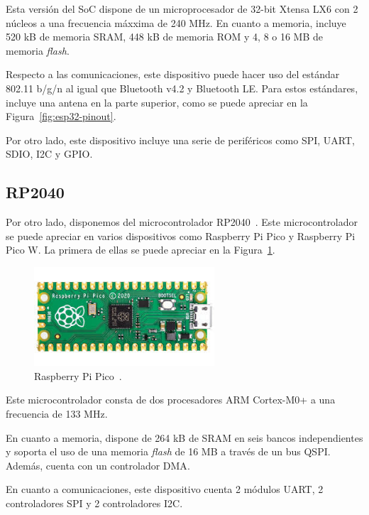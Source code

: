 Esta versión del \ac{SoC} dispone de un microprocesador de 32-bit Xtensa LX6 con 2 núcleos a una frecuencia máxxima de 240 MHz.
En cuanto a memoria, incluye 520 kB de memoria SRAM, 448 kB de memoria ROM y 4, 8 o 16 MB de memoria \textit{flash}.

Respecto a las comunicaciones, este dispositivo puede hacer uso del estándar 802.11 b/g/n al igual que Bluetooth v4.2 y Bluetooth LE.
Para estos estándares, incluye una antena en la parte superior, como se puede apreciar en la Figura~\ref{fig:esp32-pinout}.

Por otro lado, este dispositivo incluye una serie de periféricos como \ac{SPI}, \ac{UART}, \ac{SDIO}, \ac{I2C} y \ac{GPIO}.



\subsection{RP2040}\label{subsec:RP2040}

Por otro lado, disponemos del microcontrolador RP2040~\cite{rp2040-spec}.
Este microcontrolador se puede apreciar en varios dispositivos como Raspberry Pi Pico y Raspberry Pi Pico W.
La primera de ellas se puede apreciar en la Figura~\ref{fig:raspberry-pico}.

\begin{figure}[h]
    \centering
    \includegraphics[width=0.6\textwidth]{figures/raspberry-pico.jpeg}
    \caption{Raspberry Pi Pico~\cite{rp2040-img}.}
    \label{fig:raspberry-pico}
\end{figure}

Este microcontrolador consta de dos procesadores ARM Cortex-M0+ a una frecuencia de 133 MHz.

En cuanto a memoria, dispone de 264 kB de SRAM en seis bancos independientes y soporta el uso de una memoria \textit{flash} de 16 MB a través de un bus QSPI.
Además, cuenta con un controlador \ac{DMA}.

En cuanto a comunicaciones, este dispositivo cuenta 2 módulos \ac{UART}, 2 controladores \ac{SPI} y 2 controladores \ac{I2C}.

